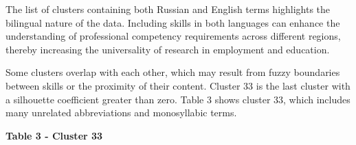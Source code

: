 The list of clusters containing both Russian and English terms
highlights the bilingual nature of the data. Including skills in both
languages can enhance the understanding of professional competency
requirements across different regions, thereby increasing the
universality of research in employment and education.

Some clusters overlap with each other, which may result from fuzzy
boundaries between skills or the proximity of their content. Cluster 33
is the last cluster with a silhouette coefficient greater than zero.
Table 3 shows cluster 33, which includes many unrelated abbreviations
and monosyllabic terms.

{\bfseries Table 3 - Cluster 33}

